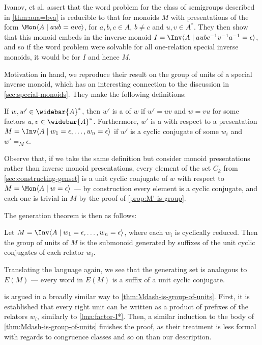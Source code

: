 \documentclass[noindex,noinsetproof,12pt]{lmaths}
\newcommand{\Abar}{\widebar{A}}
\begin{document}
Ivanov, et al. assert that the word problem for the class of semigroups described in \cref{thm:aua=bva} is reducible to that for monoids $M$ with presentations of the form $\Mon \langle A \mid aub = avc \rangle$, for $a, b, c \in A$, $b \ne c$ and $u, v \in A^*$. They then show that this monoid embeds in the inverse monoid $I = \Inv \langle A \mid aubc^{-1}v^{-1}a^{-1} = \epsilon\rangle$, and so if the word problem were solvable for all one-relation special inverse monoids, it would be for $I$ and hence $M$.


Motivation in hand, we reproduce their result on the group of units of a special inverse monoid, which has an interesting connection to the discussion in \cref{sec:special-monoids}. They make the following definitions:

\begin{defn}
	If $w, w' \in \Abar^*$, then $w'$ is a  of $w$ if $w' = uv$ and $w = vu$ for some factors $u, v \in \Abar^*$. Furthermore, $w'$ is a  with respect to a presentation $M = \Inv \langle A \mid w_1 = \epsilon, \ldots, w_n = \epsilon \rangle$ if $w'$ is a cyclic conjugate of some $w_i$ and $w' =_M \epsilon$.
\end{defn}

Observe that, if we take the same definition but consider monoid presentations rather than inverse monoid presentations, every element of the set $C_k$ from \cref{sec:constructing-genset} is a unit cyclic conjugate of $w$ with respect to $M = \Mon \langle A \mid w = \epsilon \rangle$ --- by construction every element is a cyclic conjugate, and each one is trivial in $M$ by the proof of \cref{prop:M'-is-group}.

The generation theorem is then as follows:

\begin{theorem} \label{thm:inv-monoid-units-unit-conjugates}
	Let $M = \Inv \langle A \mid w_1 = \epsilon, \ldots, w_n = \epsilon\rangle$, where each $w_i$ is cyclically reduced. Then the group of units of $M$ is the submonoid generated by suffixes of the unit cyclic conjugates of each relator $w_i$.
\end{theorem}

Translating the language again, we see that the generating set is analogous to $E(M)$ --- every word in $E(M)$ is a suffix of a unit cyclic conjugate.

 is argued in a broadly similar way to \cref{thm:Mdash-is-group-of-units}. First, it is established that every right unit can be written as a product of prefixes of the relators $w_i$, similarly to \cref{lma:factor-I*}. Then, a similar induction to the body of \cref{thm:Mdash-is-group-of-units} finishes the proof, as their treatment is less formal with regards to congruence classes and so on than our description.
\end{document}
